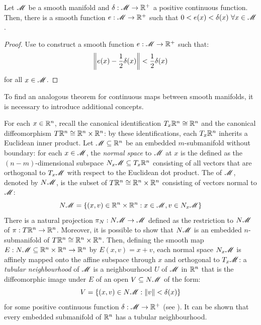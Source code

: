 \begin{corollary}{}{}
  Let $ \mathscr{M} $ be a smooth manifold and $ \delta : \mathscr{M} \rightarrow \mathbb{R}^+ $ a positive continuous function. Then, there is a smooth function $ e : \mathscr{M} \rightarrow \mathbb{R}^+ $ such that $ 0 < e(x) < \delta(x) \,\,\forall x \in \mathscr{M} $.
\end{corollary}

\begin{proofbox}
  \begin{proof}
    Use  to construct a smooth function $ e : \mathscr{M} \rightarrow \mathbb{R}^+ $ such that:
    \begin{equation*}
      \left\lVert e(x) - \frac{1}{2} \delta(x)\right\rVert < \frac{1}{2} \delta(x)
    \end{equation*}
    for all $ x \in \mathscr{M} $.
  \end{proof}
\end{proofbox}

To find an analogous theorem for continuous maps between smooth manifolds, it is necessary to introduce additional concepts.

For each $ x \in \mathbb{R}^n $, recall the canonical identification $ T_x \mathbb{R}^n \cong \mathbb{R}^n $ and the canonical diffeomorphism $ T\mathbb{R}^n \cong \mathbb{R}^n \times \mathbb{R}^n $: by these identifications, each $ T_x \mathbb{R}^n $ inherits a Euclidean inner product. Let $ \mathscr{M} \subseteq \mathbb{R}^n $ be an embedded $ m $-submanifold without boundary: for each $ x \in \mathscr{M} $, the \emph{normal space} to $ \mathscr{M} $ at $ x $ is the defined as the $ (n-m) $-dimensional subspace $ N_x\mathscr{M} \subseteq T_x \mathbb{R}^n $ consisting of all vectors that are orthogonal to $ T_x\mathscr{M} $ with respect to the Euclidean dot product. The  of $ \mathscr{M} $, denoted by $ N\mathscr{M} $, is the subset of $ T\mathbb{R}^n \cong \mathbb{R}^n \times \mathbb{R}^n $ consisting of vectors normal to $ \mathscr{M} $:
\begin{equation}
  N\mathscr{M} = \{(x,v) \in \mathbb{R}^n \times \mathbb{R}^n : x \in \mathscr{M} , v \in N_x\mathscr{M}\}
\end{equation}
There is a natural projection $ \pi_N : N\mathscr{M} \rightarrow \mathscr{M} $ defined as the restriction to $ N\mathscr{M} $ of $ \pi : T\mathbb{R}^n \rightarrow \mathbb{R}^n $. Moreover, it is possible to show that $ N\mathscr{M} $ is an embedded $ n $-submanifold of $ T\mathbb{R}^n \cong \mathbb{R}^n \times \mathbb{R}^n $. Then, defining the smooth map $ E : N\mathscr{M} \subseteq \mathbb{R}^n \times \mathbb{R}^n \rightarrow \mathbb{R}^n $ by $ E(x,v) = x + v $, each normal space $ N_x\mathscr{M} $ is affinely mapped onto the affine subspace through $ x $ and orthogonal to $ T_x\mathscr{M} $: a \emph{tubular neighbourhood} of $ \mathscr{M} $ is a neighbourhood $ U $ of $ \mathscr{M} $ in $ \mathbb{R}^n $ that is the diffeomorphic image under $ E $ of an open $ V \subseteq N\mathscr{M} $ of the form:
\begin{equation}
  V = \{(x,v) \in N\mathscr{M} : \left\lVert v\right\rVert < \delta(x)\}
\end{equation}
for some positive continuous function $ \delta : \mathscr{M} \rightarrow \mathbb{R}^+ $ (see ). It can be shown that every embedded submanifold of $ \mathbb{R}^n $ has a tubular neighbourhood.

